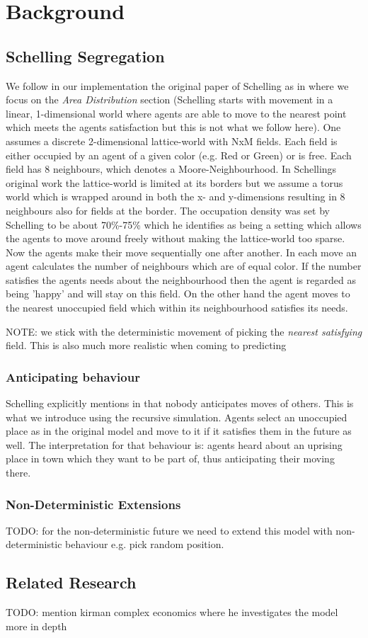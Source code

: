 \section{Background}

\subsection{Schelling Segregation}
We follow in our implementation the original paper of Schelling as in \cite{schelling_dynamic_1971} where we focus on the \textit{Area Distribution} section (Schelling starts with movement in a linear, 1-dimensional world where agents are able to move to the nearest point which meets the agents satisfaction but this is not what we follow here). One assumes a discrete 2-dimensional lattice-world with NxM fields. Each field is either occupied by an agent of a given color (e.g. Red or Green) or is free. Each field has 8 neighbours, which denotes a Moore-Neighbourhood. In Schellings original work the lattice-world is limited at its borders but we assume a torus world which is wrapped around in both the x- and y-dimensions resulting in 8 neighbours also for fields at the border. The occupation density was set by Schelling to be about 70\%-75\% which he identifies as being a setting which allows the agents to move around freely without making the lattice-world too sparse.
Now the agents make their move sequentially one after another. In each move an agent calculates the number of neighbours which are of equal color. If the number satisfies the agents needs about the neighbourhood then the agent is regarded as being 'happy' and will stay on this field. On the other hand the agent moves to the nearest unoccupied field which within its neighbourhood satisfies its needs.

NOTE: we stick with the deterministic movement of picking the \textit{nearest satisfying} field. This is also much more realistic when coming to predicting

\subsubsection{Anticipating behaviour}
Schelling explicitly mentions in \cite{schelling_dynamic_1971} that nobody anticipates moves of others. This is what we introduce using the recursive simulation. Agents select an unoccupied place as in the original model and move to it if it satisfies them in the future as well. The interpretation for that behaviour is: agents heard about an uprising place in town which they want to be part of, thus anticipating their moving there.

\subsubsection{Non-Deterministic Extensions}
TODO: for the non-deterministic future we need to extend this model with non-deterministic behaviour e.g. pick random position.

\subsection{Related Research}
TODO: \cite{kirman_complex_2010} mention kirman complex economics where he investigates the model more in depth